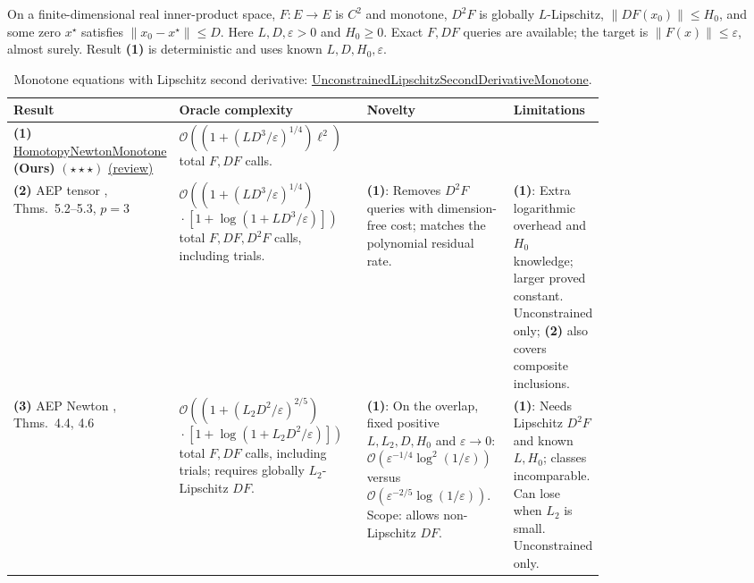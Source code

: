 \begin{table}[tp]
\centering
\caption{Monotone equations with Lipschitz second derivative: \href{https://github.com/k3nfalt/longtails/blob/main/LongTails/Setups/UnconstrainedLipschitzSecondDerivativeMonotone.lean}{UnconstrainedLipschitzSecondDerivativeMonotone}.}\label{tab:UnconstrainedLipschitzSecondDerivativeMonotone}
\parbox{\linewidth}{\footnotesize On a finite-dimensional real inner-product space, $F:E\to E$ is $C^2$ and monotone, $D^2F$ is globally $L$-Lipschitz, $\|DF(x_0)\|\le H_0$, and some zero $x^\star$ satisfies $\|x_0-x^\star\|\le D$. Here $L,D,\varepsilon>0$ and $H_0\ge0$. Exact $F,DF$ queries are available; the target is $\|F(x)\|\le\varepsilon$, almost surely. Result \textbf{(1)} is deterministic and uses known $L,D,H_0,\varepsilon$.}\par\smallskip
\begin{threeparttable}
\footnotesize
\setlength{\tabcolsep}{4pt}\renewcommand{\arraystretch}{1.25}
\begin{tabularx}{\linewidth}{@{}>{\raggedright\arraybackslash}p{0.20\linewidth}>{\raggedright\arraybackslash}p{0.32\linewidth}>{\raggedright\arraybackslash}p{0.25\linewidth}>{\raggedright\arraybackslash}X@{}}
\toprule
\textbf{Result} & \textbf{Oracle complexity} & \textbf{Novelty} & \textbf{Limitations} \\
\midrule
\textbf{(1)} \href{https://github.com/k3nfalt/longtails/blob/main/LongTails/Theorems/HomotopyNewtonMonotone.lean}{Homotopy\allowbreak Newton\allowbreak Monotone} \textbf{(Ours)} $(\star\star\star)$ \href{https://github.com/k3nfalt/longtails/blob/main/scripts/reviews/HomotopyNewtonMonotone.md}{(review)} & $\mathcal{O}\!\left((1+(LD^3/\varepsilon)^{1/4})\ell^2\right)$ total $F,DF$ calls. & & \\
\midrule[1.2pt]
\textbf{(2)} AEP tensor \citep{hssJiangYoon2026v1}, Thms.~5.2--5.3, $p=3$ & $\mathcal{O}\!\left((1+(LD^3/\varepsilon)^{1/4})\right.$\newline $\left.{}\cdot[1+\log(1+LD^3/\varepsilon)]\right)$ total $F,DF,D^2F$ calls, including trials. & \textbf{(1)}: Removes $D^2F$ queries with dimension-free cost; matches the polynomial residual rate. & \textbf{(1)}: Extra logarithmic overhead and $H_0$ knowledge; larger proved constant. Unconstrained only; \textbf{(2)} also covers composite inclusions. \\
\midrule
\textbf{(3)} AEP Newton \citep{hssJiangYoon2026v1}, Thms.~4.4, 4.6 & $\mathcal{O}\!\left((1+(L_2D^2/\varepsilon)^{2/5})\right.$\newline $\left.{}\cdot[1+\log(1+L_2D^2/\varepsilon)]\right)$ total $F,DF$ calls, including trials; requires globally $L_2$-Lipschitz $DF$. & \textbf{(1)}: On the overlap, fixed positive $L,L_2,D,H_0$ and $\varepsilon\to0$: $\mathcal{O}(\varepsilon^{-1/4}\log^2(1/\varepsilon))$ versus $\mathcal{O}(\varepsilon^{-2/5}\log(1/\varepsilon))$. Scope: allows non-Lipschitz $DF$. & \textbf{(1)}: Needs Lipschitz $D^2F$ and known $L,H_0$; classes incomparable. Can lose when $L_2$ is small. Unconstrained only. \\

\end{tabularx}
\end{threeparttable}
\end{table}
